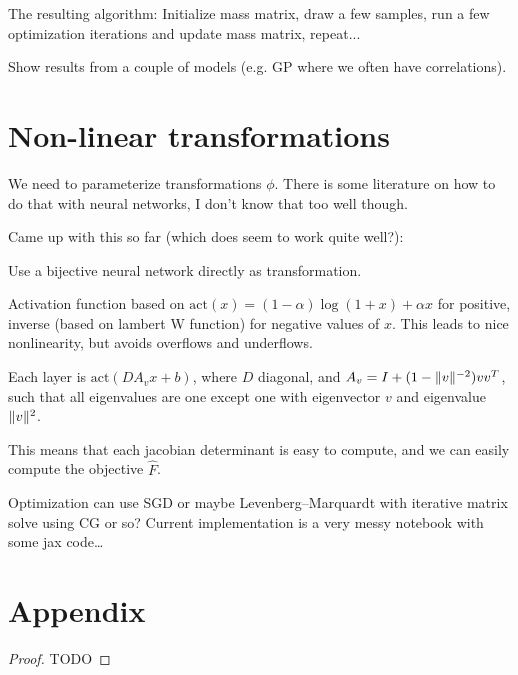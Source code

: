 \documentclass{scrartcl}
\DeclarePairedDelimiter{\norm}{\lVert}{\rVert}
\begin{document}
The resulting algorithm: Initialize mass matrix, draw a few samples, run a few
optimization iterations and update mass matrix, repeat...

Show results from a couple of models (e.g. GP where we often have correlations).

\section{Non-linear transformations}

We need to parameterize transformations $\phi$. There is some literature on
how to do that with neural networks, I don't know that too well though.

Came up with this so far (which does seem to work quite well?):

Use a bijective neural network directly as transformation.

Activation function based on $\text{act}(x) = (1 - α)\log(1 + x) + αx$ for positive, inverse
(based on lambert W function) for negative values of $x$. This leads to nice
nonlinearity, but avoids overflows and underflows.

Each layer is $\text{act}(DA_vx + b)$, where $D$ diagonal, and $A_v = I
+ (1 - \norm{v}^{-2})vv^T$, such that all eigenvalues are one
except one with eigenvector $v$ and eigenvalue $\norm{v}^2$.

This means that each jacobian determinant is easy to compute, and we can easily
compute the objective $\hat F$.

Optimization can use SGD or maybe Levenberg–Marquardt with iterative matrix
solve using CG or so? Current implementation is a very messy notebook with some
jax code\dots

\section*{Appendix}

\begin{proof}
TODO

\end{proof}
\end{document}
